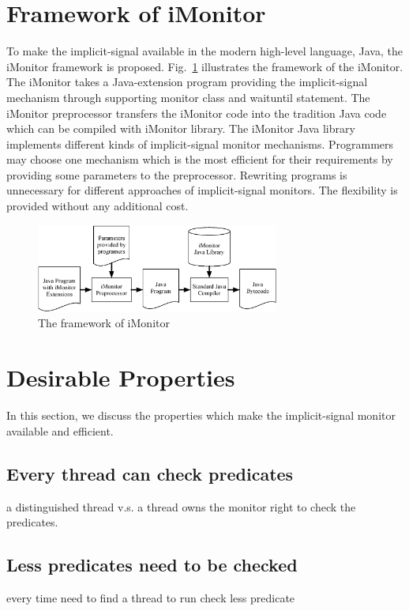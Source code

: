 \documentclass[preprint]{sigplanconf}
\begin{document}
\section{Framework of iMonitor} \label{sec:fw}
To make the implicit-signal available in the modern high-level language, Java, 
the iMonitor framework is proposed. Fig.~\ref{fig:framework} illustrates the 
framework of the iMonitor. The iMonitor takes a Java-extension program providing
the implicit-signal mechanism through supporting monitor class and waituntil 
statement. The iMonitor preprocessor transfers the iMonitor code into the 
tradition Java code which can be compiled with iMonitor library. The iMonitor 
Java library implements different kinds of implicit-signal monitor mechanisms. 
Programmers may choose one mechanism which is the most efficient for their 
requirements by providing some parameters to the preprocessor. Rewriting 
programs is unnecessary for different approaches of implicit-signal monitors. 
The flexibility is provided without any additional cost. 

\begin{figure}[ht!]
  \centering
  \includegraphics[width=80mm]{fig/flow.eps}
  \caption{The framework of iMonitor}
  \label{fig:framework}
\end{figure}

\section{Desirable Properties}
In this section, we discuss the properties which make the implicit-signal 
monitor available and efficient.

\subsection{Every thread can check predicates}
a distinguished thread v.s. a thread owns the monitor right to check the predicates.

\subsection{Less predicates need to be checked}
every time need to find a thread to run check less predicate 
\end{document}
